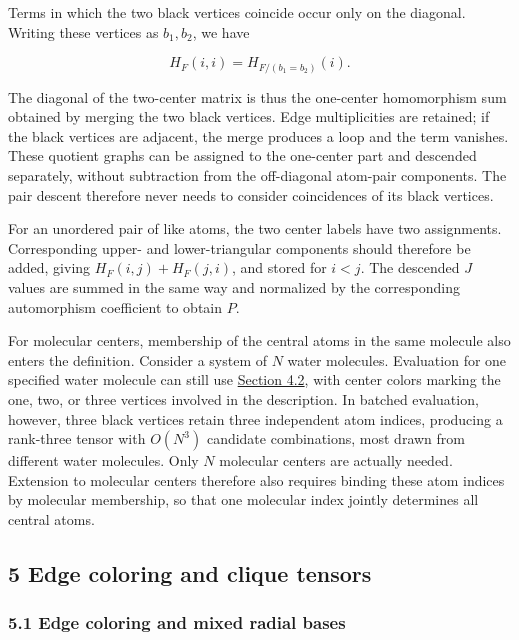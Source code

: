 Terms in which the two black vertices coincide occur only on the diagonal. Writing these vertices as \(b_1,b_2\), we have

\[
H_F(i,i)=H_{F/(b_1=b_2)}(i).
\]

The diagonal of the two-center matrix is thus the one-center homomorphism sum obtained by merging the two black vertices. Edge multiplicities are retained; if the black vertices are adjacent, the merge produces a loop and the term vanishes. These quotient graphs can be assigned to the one-center part and descended separately, without subtraction from the off-diagonal atom-pair components. The pair descent therefore never needs to consider coincidences of its black vertices.

For an unordered pair of like atoms, the two center labels have two assignments. Corresponding upper- and lower-triangular components should therefore be added, giving \(H_F(i,j)+H_F(j,i)\), and stored for \(i<j\). The descended \(J\) values are summed in the same way and normalized by the corresponding automorphism coefficient to obtain \(P\).

For molecular centers, membership of the central atoms in the same molecule also enters the definition. Consider a system of \(N\) water molecules. Evaluation for one specified water molecule can still use \hyperref[sec:zero-element-atom-center]{Section 4.2}, with center colors marking the one, two, or three vertices involved in the description. In batched evaluation, however, three black vertices retain three independent atom indices, producing a rank-three tensor with \(O(N^3)\) candidate combinations, most drawn from different water molecules. Only \(N\) molecular centers are actually needed. Extension to molecular centers therefore also requires binding these atom indices by molecular membership, so that one molecular index jointly determines all central atoms.




\subsection{5 Edge coloring and clique tensors}\label{sec:edge-colors-and-clique-tensors}

\subsubsection{5.1 Edge coloring and mixed radial bases}\label{sec:edge-colored-radial-basis}

